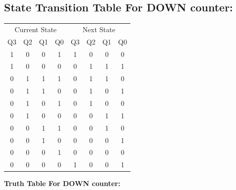 \documentclass[a4paper,12pt]{article}
\begin{document}
\subsection{\textbf{State Transition Table For DOWN counter:}}
\begin{table}[H]
    \centering
    \begin{tabular}{c c c c | c c c c}
        \toprule
        \multicolumn{4}{c|}{Current State} & \multicolumn{4}{c}{Next State} \\
	    Q3 & Q2 & Q1 & Q0 & Q3 & Q2 & Q1 & Q0 \\
        \midrule
	    1 & 0 & 0 & 1 & 1 & 0 & 0 & 0 \\
	    1 & 0 & 0 & 0 & 0 & 1 & 1 & 1 \\
	    0 & 1 & 1 & 1 & 0 & 1 & 1 & 0 \\
	    0 & 1 & 1 & 0 & 0 & 1 & 0 & 1 \\
	    0 & 1 & 0 & 1 & 0 & 1 & 0 & 0 \\
	    0 & 1 & 0 & 0 & 0 & 0 & 1 & 1 \\
	    0 & 0 & 1 & 1 & 0 & 0 & 1 & 0 \\
	    0 & 0 & 1 & 0 & 0 & 0 & 0 & 1 \\
	    0 & 0 & 0 & 1 & 0 & 0 & 0 & 0 \\
	    0 & 0 & 0 & 0 & 1 & 0 & 0 & 1 \\
        \bottomrule
    \end{tabular}
\end{table}
\textbf{Truth Table For DOWN counter:}
\end{document}
